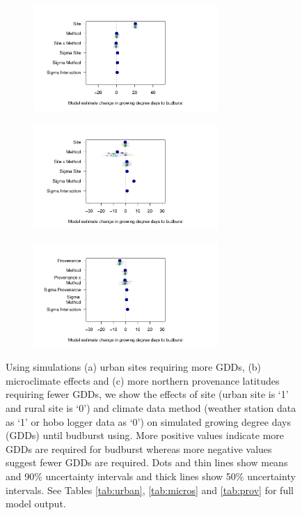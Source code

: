 \documentclass{article}\usepackage[]{graphicx}\usepackage[]{color}
\begin{document}
\begin{enumerate}
  
\begin{figure}[H]
  \begin{subfigure}{.33\linewidth}
    \caption{}
      \centering
      \includegraphics[height=4cm, width=7cm]{..//analyses/figures/muplot_urban.pdf}
      \label{fig:muurban}
  \end{subfigure}%
    \begin{subfigure}{.33\linewidth}
      \caption{}
      \centering
      \includegraphics[height=4cm, width=7cm]{..//analyses/figures/muplot_micros.pdf}
    \label{fig:mumicros}
  \end{subfigure}
  \begin{subfigure}{.33\linewidth}
      \caption{}
      \centering
      \includegraphics[height=4cm, width=7cm]{..//analyses/figures/muplot_prov.pdf}
    \label{fig:muprov}
  \end{subfigure}
\caption{ Using simulations (a) urban sites requiring more GDDs, (b) microclimate effects and (c) more northern provenance latitudes requiring fewer GDDs, we show the effects of site (urban site is `1' and rural site is `0') and climate data method (weather station data as `1' or hobo logger data as `0') on simulated growing degree days (GDDs) until budburst using. More positive values indicate more GDDs are required for budburst whereas more negative values suggest fewer GDDs are required. Dots and thin lines show means and 90\% uncertainty intervals and thick lines show 50\% uncertainty intervals. See Tables \ref{tab:urban}, \ref{tab:micros} and \ref{tab:prov} for full model output. }
\label{fig:musims}
\end{figure}
  

\end{enumerate}
\end{document}
